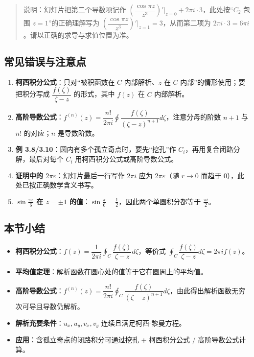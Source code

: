 \begin{quote}
说明：幻灯片把第二个导数项记作
\(\left(\dfrac{\cos\pi z}{z^3}\right)'\Big|_{z=0}+2\pi i\cdot3\)，此处按``\(C_2\)
包围 \(z=1\)''的正确理解写为
\(\left(\dfrac{\cos\pi z}{z^3}\right)'\Big|_{z=1}=3\)，从而第二项为
\(2\pi i\cdot3=6\pi i\)。请以正确的求导与求值位置为准。
\end{quote}

\subsection{常见错误与注意点}\label{ux5e38ux89c1ux9519ux8befux4e0eux6ce8ux610fux70b9-9}

\begin{enumerate}
\def\labelenumi{\arabic{enumi}.}
\tightlist
\item
  \textbf{柯西积分公式}：只对``被积函数在 \(C\) 内部解析、\(z\) 在 \(C\)
  内部''的情形使用；要把积分写成 \(\dfrac{f(\zeta)}{\zeta-z}\)
  的形式，其中 \(f(z)\) 在 \(C\) 内部解析。
\item
  \textbf{高阶导数公式}：\(f^{(n)}(z)=\dfrac{n!}{2\pi i}\oint\dfrac{f(\zeta)}{(\zeta-z)^{n+1}}d\zeta\)，注意分母的阶数
  \(n+1\) 与 \(n!\) 的对应；\(n\) 是导数阶数。
\item
  \textbf{例 3.8/3.10}：圆内有多个孤立奇点时，要先``挖孔''作
  \(C_i\)，再用复合闭路分解，最后对每个 \(C_i\)
  用柯西积分公式或高阶导数公式。
\item
  \textbf{证明中的 \(2\pi\varepsilon\)}：幻灯片最后一行写作 \(2\pi i\)
  应为 \(2\pi\varepsilon\)（随 \(r\to0\) 而趋于
  \(0\)），此处已按正确数学含义书写。
\item
  \textbf{\(\sin\frac{\pi z}{6}\) 在 \(z=\pm1\)
  的值}：\(\sin\frac{\pi}{6}=\frac12\)，因此两个单圆积分都等于
  \(\frac{\pi i}{2}\)。
\end{enumerate}

\subsection{本节小结}\label{ux672cux8282ux5c0fux7ed3-9}

\begin{itemize}
\tightlist
\item
  \textbf{柯西积分公式}：\(f(z)=\dfrac{1}{2\pi i}\oint_C\dfrac{f(\zeta)}{\zeta-z}d\zeta\)，等价式
  \(\oint_C\dfrac{f(\zeta)}{\zeta-z}d\zeta=2\pi i f(z)\)。
\item
  \textbf{平均值定理}：解析函数在圆心处的值等于它在圆周上的平均值。
\item
  \textbf{高阶导数公式}：\(f^{(n)}(z)=\dfrac{n!}{2\pi i}\oint_C\dfrac{f(\zeta)}{(\zeta-z)^{n+1}}d\zeta\)，由此得出解析函数无穷次可导且导数仍解析。
\item
  \textbf{解析充要条件}：\(u_x,u_y,v_x,v_y\) 连续且满足柯西-黎曼方程。
\item
  \textbf{应用}：含孤立奇点的闭路积分可通过挖孔 + 柯西积分公式 /
  高阶导数公式计算。
\end{itemize}

